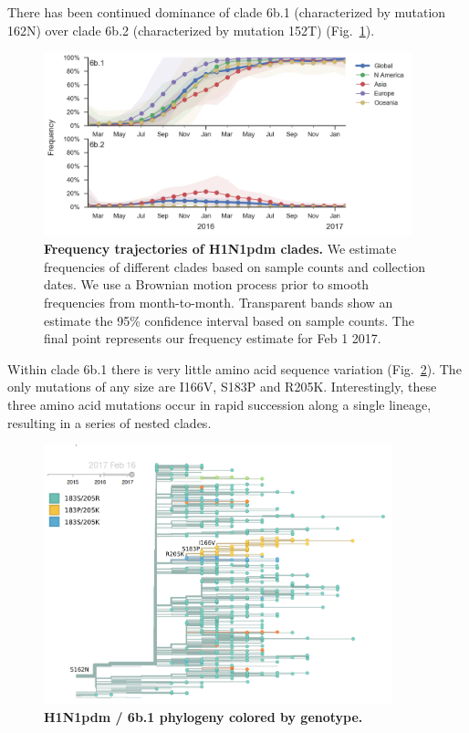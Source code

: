 \documentclass[11pt,oneside,letterpaper]{article}
\begin{document}
\pagebreak

There has been continued dominance of clade 6b.1 (characterized by mutation 162N) over clade 6b.2 (characterized by mutation 152T) (Fig.\ \ref{H1N1pdm_clades}).

\begin{figure}[H]
	\centering
	\includegraphics[width=0.95\textwidth]{../figures/feb-2017/H1N1pdm_clades.png}
	\caption{\textbf{Frequency trajectories of H1N1pdm clades.}
	We estimate frequencies of different clades based on sample counts and collection dates.
	We use a Brownian motion process prior to smooth frequencies from month-to-month.
	Transparent bands show an estimate the 95\% confidence interval based on sample counts.
	The final point represents our frequency estimate for Feb 1 2017.
	}
	\label{H1N1pdm_clades}
\end{figure}

\pagebreak

Within clade 6b.1 there is very little amino acid sequence variation (Fig.\ \ref{H1N1pdm_tree}). The only mutations of any size are I166V, S183P and R205K. Interestingly, these three amino acid mutations occur in rapid succession along a single lineage, resulting in a series of nested clades.

\begin{figure}[H]
	\centering
	\includegraphics[width=0.9\textwidth]{../figures/feb-2017/h1n1pdm_tree.png}
	\caption{\textbf{H1N1pdm / 6b.1 phylogeny colored by genotype.}
	}
	\label{H1N1pdm_tree}
\end{figure}
\end{document}
